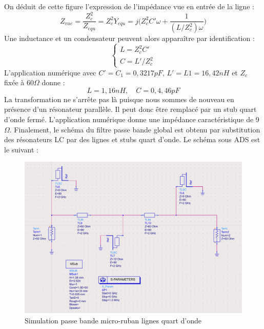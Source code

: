 \documentclass[french]{article}
\begin{document}
On déduit de cette figure l'expression de l'impédance vue en entrée de la ligne :
\begin{equation}
	Z_{vue}=\frac{Z_c^2}{Z_{equ}}=Z_c^2Y_{equ}=j\Bigg(Z_c^2C'\omega+\frac{1}{(L/Z_c^2)\omega}\Bigg)
\end{equation}
Une inductance et un condensateur peuvent alors apparaître par identification :
\begin{equation}
\left\{\begin{matrix}
L=Z_c^2C' \\
C=L'/Z_c^2
\end{matrix}\right.
\label{eqmatrix}
\end{equation}
L'application numérique avec $C'=C_1=0,3217pF$, $L'=L1=16,42nH$ et $Z_c$ fixée à 60$\Omega$ donne :
\begin{equation}
	L=1,16nH, \quad C=0,4,46pF
\end{equation}
La transformation ne s'arrête pas là puisque nous sommes de nouveau en présence d'un résonateur parallèle. Il peut donc être remplacé par un stub quart d'onde fermé. L'application numérique donne une impédance caractéristique de 9$\Omega$. Finalement, le schéma du filtre passe bande global est obtenu par substitution des résonateurs LC par des lignes et stubs quart d'onde. Le schéma sous ADS est le suivant :
\begin{figure}[H]
	\centering
	\includegraphics[width=0.7\linewidth]{../4synthPBande/inverseur_impedance/montage_inverseur_ADS}
	\caption{Simulation passe bande micro-ruban lignes quart d'onde}
	\label{fig:montageinverseurads}
\end{figure}
\end{document}
